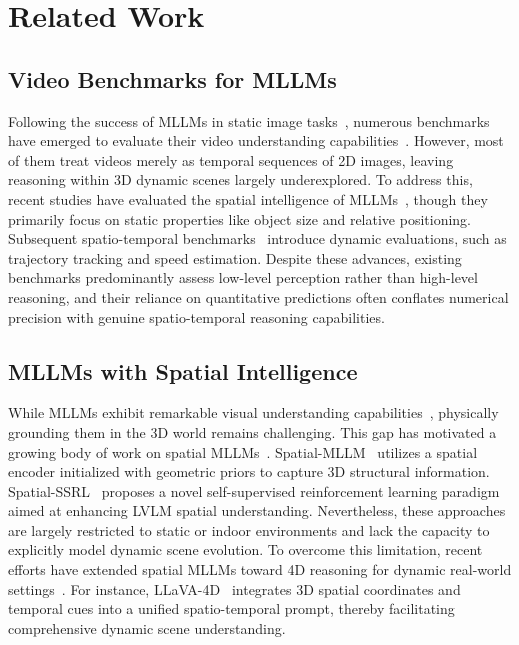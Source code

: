 \section{Related Work}
\subsection{Video Benchmarks for MLLMs}
Following the success of MLLMs in static image tasks~\citep{SEED-Bench,MMBench,MM-Vet,MMMU}, numerous benchmarks have emerged to evaluate their video understanding capabilities~\citep{MMBench-Video,Video-MME,MVBench,VITATECS,MSQA,TempCompass,OpenEQA,EgoSchema,Video-Bench,TOMATO,SpatialEval,MM-Ego}. 
However, most of them treat videos merely as temporal sequences of 2D images, leaving reasoning within 3D dynamic scenes largely underexplored. 
To address this, recent studies have evaluated the spatial intelligence of MLLMs~\citep{OmniSpatial,MMSI-Video-Bench,SpaceR,VSI-Bench,Cambrian-S,SPAR-Bench}, though they primarily focus on static properties like object size and relative positioning. 
Subsequent spatio-temporal benchmarks~\citep{Dyn-Bench,STI-Bench,OST-Bench,VideoLoom,MLLM-4D,DSI-Bench,DSR-Bench,VLM4D} introduce dynamic evaluations, such as trajectory tracking and speed estimation. 
Despite these advances, existing benchmarks predominantly assess low-level perception rather than high-level reasoning, and their reliance on quantitative predictions often conflates numerical precision with genuine spatio-temporal reasoning capabilities.

\subsection{MLLMs with Spatial Intelligence}
While MLLMs exhibit remarkable visual understanding capabilities~\citep{LLaVA-OneVision-1.5,Claude,LongVILA,LLaVA-OneVision,VILA,GPT-5,Gemini,InternVL3.5,LongVA,LLaVA-Video}, physically grounding them in the 3D world remains challenging. 
This gap has motivated a growing body of work on spatial MLLMs~\citep{SpatialVLM,VLM-3R,3DRS,GeoThinker,SpatialLadder,SpatialCoT,Spatial-SSRL,SpaceR,SoFar,Spatial-MLLM,VST,GeoSR,Think3D,VG-LLM,LLaVA-3D}.
Spatial-MLLM~\citep{Spatial-MLLM} utilizes a spatial encoder initialized with geometric priors to capture 3D structural information. 
Spatial-SSRL~\citep{Spatial-SSRL} proposes a novel self-supervised reinforcement learning paradigm aimed at enhancing LVLM spatial understanding.
Nevertheless, these approaches are largely restricted to static or indoor environments and lack the capacity to explicitly model dynamic scene evolution. 
To overcome this limitation, recent efforts have extended spatial MLLMs toward 4D reasoning for dynamic real-world settings~\citep{LLaVA-4D,Uni4D-LLM}. 
For instance, LLaVA-4D~\citep{LLaVA-4D} integrates 3D spatial coordinates and temporal cues into a unified spatio-temporal prompt, thereby facilitating comprehensive dynamic scene understanding.
